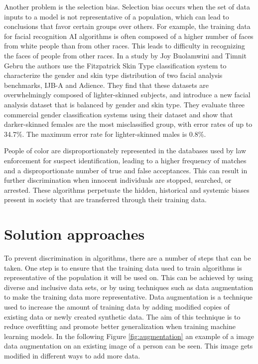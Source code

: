 \documentclass[
	12pt,
    a4paper,
    egregdoesnotlikesansseriftitles, %
    toc=chapterentrywithdots,
    oneside, openany,
    titlepage,
    parskip=half,
    headings=normal,  %
    listof=totoc,
    bibliography=totocnumbered,
    index=totoc,
    captions=tableheading,  %
    listof=flat,
    numbers=noenddot, %
    final]
    {scrbook}
\begin{document}
Another problem is the selection bias.
Selection bias occurs when the set of data inputs to a model is not representative of a population, which can lead to conclusions that favor certain groups over others. \cite[p. 8]{usa}
For example, the training data for facial recognition AI algorithms is often composed of a higher number of faces from white people than from other races. This leads to difficulty in recognizing the faces of people from other races.
In a study by Joy Buolamwini and Timnit Gebru the authors use the Fitzpatrick Skin Type classification system to characterize the gender and skin type distribution of two facial analysis benchmarks, IJB-A and Adience. 
They find that these datasets are overwhelmingly composed of lighter-skinned subjects, and introduce a new facial analysis dataset that is balanced by gender and skin type. 
They evaluate three commercial gender classification systems using their dataset and show that darker-skinned females are the most misclassified group, with error rates of up to 34.7\%. 
The maximum error rate for lighter-skinned males is 0.8\%. 
\cite[p. 1]{buolamwini_gender_2018}


People of color are disproportionately represented in the databases used by law enforcement for suspect identification, leading to a higher frequency of matches and a disproportionate number of true and false acceptances. \cite[p. 323-324]{bacchini_race_2019}
This can result in further discrimination when innocent individuals are stopped, searched, or arrested. 
These algorithms perpetuate the hidden, historical and systemic biases present in society that are transferred through their training data. \cite[p. 8]{usa}



\chapter{Solution approaches}
To prevent discrimination in algorithms, there are a number of steps that can be taken. 
One step is to ensure that the training data used to train algorithms is representative of the population it will be used on. 
This can be achieved by using diverse and inclusive data sets, or by using techniques such as data augmentation to make the training data more representative.
Data augmentation is a technique used to increase the amount of training data by adding modified copies of existing data or newly created synthetic data.
The aim of this technique is to reduce overfitting and promote better generalization when training machine learning models. \cite[p. 2]{nanni2022feature}
In the following Figure \ref{fig:augmentation} an example of a image data augmentation on an existing image of a person can be seen. 
This image gets modified in different ways to add more data.
\end{document}
